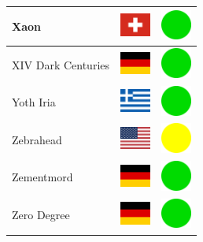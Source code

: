 \documentclass[12pt, a4paper, twoside]{report}
\begin{document}
\begin{center}
\begin{longtable}{|p{5cm}|p{2cm}|p{2cm}|}
 Xaon                                                       & \includegraphics[width=1cm]{../img/flags/ch} &   \includegraphics[width=1cm]{../likes/y} \\ \hline
 XIV Dark Centuries                                         & \includegraphics[width=1cm]{../img/flags/de} &   \includegraphics[width=1cm]{../likes/y} \\ \hline
 Yoth Iria                                                  & \includegraphics[width=1cm]{../img/flags/gr} &   \includegraphics[width=1cm]{../likes/y} \\ \hline
 Zebrahead                                                  & \includegraphics[width=1cm]{../img/flags/us} &   \includegraphics[width=1cm]{../likes/m} \\ \hline
 Zementmord                                                 & \includegraphics[width=1cm]{../img/flags/de} &   \includegraphics[width=1cm]{../likes/y} \\ \hline
 Zero Degree                                                & \includegraphics[width=1cm]{../img/flags/de} &   \includegraphics[width=1cm]{../likes/y} \\ \hline

\end{longtable}
\end{center}
\end{document}
